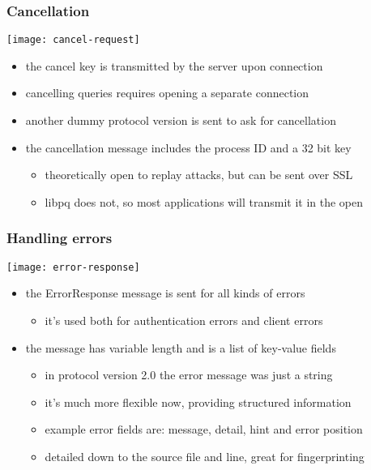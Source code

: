 \documentclass{beamer}
\begin{document}
\begin{frame}
  \frametitle{Cancellation}

  \begin{center}
    \texttt{[image: cancel-request]}
  \end{center}

  \begin{itemize}
  \item the cancel key is transmitted by the server upon connection
  \item cancelling queries requires opening a separate connection
  \item another dummy protocol version is sent to ask for cancellation
  \item the cancellation message includes the process ID and a 32 bit key
    \begin{itemize}
    \item theoretically open to replay attacks, but can be sent over SSL
    \item libpq does not, so most applications will transmit it in the open
    \end{itemize}
  \end{itemize}
\end{frame}

\begin{frame}
  \frametitle{Handling errors}

  \begin{center}
    \texttt{[image: error-response]}
  \end{center}

  \begin{itemize}
  \item the ErrorResponse message is sent for all kinds of errors
    \begin{itemize}
    \item it's used both for authentication errors and client errors
    \end{itemize}
  \item the message has variable length and is a list of key-value fields
    \begin{itemize}
    \item in protocol version 2.0 the error message was just a string
    \item it's much more flexible now, providing structured information
    \item example error fields are: message, detail, hint and error position
    \item detailed down to the source file and line, great for fingerprinting
    \end{itemize}
  \end{itemize}
\end{frame}
\end{document}
